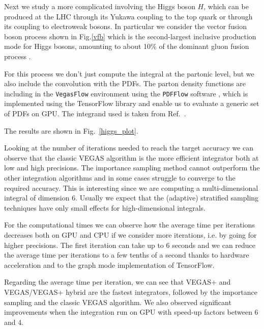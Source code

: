 \documentclass[../main/main.tex]{subfiles}
\begin{document}
Next we study a more complicated involving the Higgs boson $H$, which can be produced at the LHC through its Yukawa coupling to the top quark or through its coupling to electroweak bosons. In particular we consider the vector fusion boson process shown in Fig.\ref{vfb} which is the second-largest inclusive production mode for Higgs bosons, amounting to about 10\% of the dominant gluon fusion process \cite{Cruz_Martinez_2018}.

For this process we don't just compute the integral at the partonic level, but we also include the convolution with the PDFs. 
The parton density functions are including in the \texttt{VegasFlow} environment using the \texttt{PDFFlow} software \cite{Carrazza_2021,juan_m_cruz_martinez_2021_4903010}, which is implemented using the TensorFlow library and enable us to evaluate a generic set of PDFs on GPU. 
The integrand used is taken from Ref.~\cite{juan_m_cruz_martinez_2021_4903010}.

The results are shown in Fig.~\ref{higgs_plot}.

Looking at the number of iterations needed to reach the target accuracy we can observe that the classic VEGAS algorithm is the more efficient integrator both at low and high precisions. The importance sampling method cannot outperform the other integration algorithms and in some cases struggle to converge to the required accuracy. This is interesting since we are computing a multi-dimensional integral of dimension 6. Usually we expect that the (adaptive) stratified sampling techniques have only small effects for high-dimensional integrals.

For the computational times we can observe how the average time per iterations decreases both on GPU and CPU if we consider more iterations, i.e. by going for higher precisions. The first iteration can take up to 6 seconds and we can reduce the average time per iterations to a few tenths of a second thanks to hardware acceleration and to the graph mode implementation of TensorFlow.

Regarding the average time per iteration, we can see that VEGAS+ and VEGAS/VEGAS+ hybrid are the fastest integrators, followed by the importance sampling and the classic VEGAS algorithm. We also observed significant improvements when the integration run on GPU with speed-up factors between 6 and 4.

 
\end{document}
